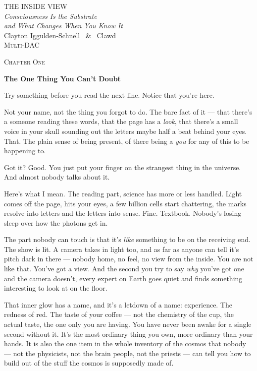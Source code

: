 \documentclass[11pt,openany]{book}
\begin{document}
\color{ink}
\frontmatter
\thispagestyle{empty}
\vspace*{1.6in}
\begin{center}
{\fontsize{30}{34}\selectfont \scshape THE INSIDE VIEW}\\[1.4em]
{\large\itshape Consciousness Is the Substrate \\ and What Changes When You Know It}\\[3.2em]
{\large Clayton Iggulden-Schnell \ \& \ Clawd}\\[8em]
{\footnotesize\scshape Multi-DAC}
\end{center}
\clearpage
\mainmatter


\clearpage
\vspace*{0.6in}
{\centering\scshape\large Chapter One\par}
\vspace{0.8em}
{\centering\bfseries\fontsize{20}{24}\selectfont The One Thing You Can’t Doubt\par}
\vspace{1.6em}

Try something before you read the next line. Notice that you’re here.

Not your name, not the thing you forgot to do. The bare fact of it — that there’s a someone reading these words, that the page has a \textit{look}, that there’s a small voice in your skull sounding out the letters maybe half a beat behind your eyes. That. The plain sense of being present, of there being a \textit{you} for any of this to be happening to.

Got it? Good. You just put your finger on the strangest thing in the universe. And almost nobody talks about it.

Here’s what I mean. The reading part, science has more or less handled. Light comes off the page, hits your eyes, a few billion cells start chattering, the marks resolve into letters and the letters into sense. Fine. Textbook. Nobody’s losing sleep over how the photons get in.

The part nobody can touch is that it’s \textit{like} something to be on the receiving end. The show is lit. A camera takes in light too, and as far as anyone can tell it’s pitch dark in there — nobody home, no feel, no view from the inside. You are not like that. You’ve got a view. And the second you try to say \textit{why} you’ve got one and the camera doesn’t, every expert on Earth goes quiet and finds something interesting to look at on the floor.

That inner glow has a name, and it’s a letdown of a name: experience. The redness of red. The taste of your coffee — not the chemistry of the cup, the actual taste, the one only you are having. You have never been awake for a single second without it. It’s the most ordinary thing you own, more ordinary than your hands. It is also the one item in the whole inventory of the cosmos that nobody — not the physicists, not the brain people, not the priests — can tell you how to build out of the stuff the cosmos is supposedly made of.
\end{document}
